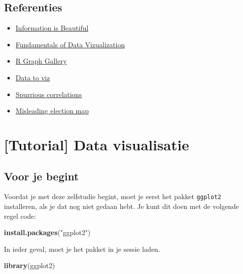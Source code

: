\documentclass[]{tufte-book}
\newenvironment{Shaded}{}{}
\newcommand{\KeywordTok}[1]{\textcolor[rgb]{0.00,0.44,0.13}{\textbf{#1}}}
\newcommand{\NormalTok}[1]{#1}
\newcommand{\StringTok}[1]{\textcolor[rgb]{0.25,0.44,0.63}{#1}}
\providecommand{\tightlist}{%
  \setlength{\itemsep}{0pt}\setlength{\parskip}{0pt}}
\begin{document}
\hypertarget{referenties-1}{%
\section{Referenties}\label{referenties-1}}

\begin{itemize}
\tightlist
\item
  \href{https://informationisbeautiful.net/}{Information is Beautiful}
\item
  \href{https://serialmentor.com/dataviz/}{Fundamentals of Data Vizualization}
\item
  \href{https://www.r-graph-gallery.com/}{R Graph Gallery}
\item
  \href{https://www.data-to-viz.com/}{Data to viz}
\item
  \href{https://www.tylervigen.com/spurious-correlations}{Spurrious correlations}
\item
  \href{https://edition.cnn.com/2020/01/17/politics/donald-trump-2016-map-county-by-county/index.html}{Misleading election map}
\end{itemize}

\hypertarget{tutorial-data-visualisatie}{%
\chapter{{[}Tutorial{]} Data visualisatie}\label{tutorial-data-visualisatie}}

\hypertarget{voor-je-begint}{%
\section{Voor je begint}\label{voor-je-begint}}

Voordat je met deze zelfstudie begint, moet je eerst het pakket \texttt{ggplot2} installeren, als je dat nog niet gedaan hebt. Je kunt dit doen met de volgende regel code:

\begin{Shaded}
\begin{Highlighting}[]
\KeywordTok{install.packages}\NormalTok{(}\StringTok{"ggplot2"}\NormalTok{)}
\end{Highlighting}
\end{Shaded}

In ieder geval, moet je het pakket in je sessie laden.

\begin{Shaded}
\begin{Highlighting}[]
\KeywordTok{library}\NormalTok{(ggplot2)}
\end{Highlighting}
\end{Shaded}
\end{document}
